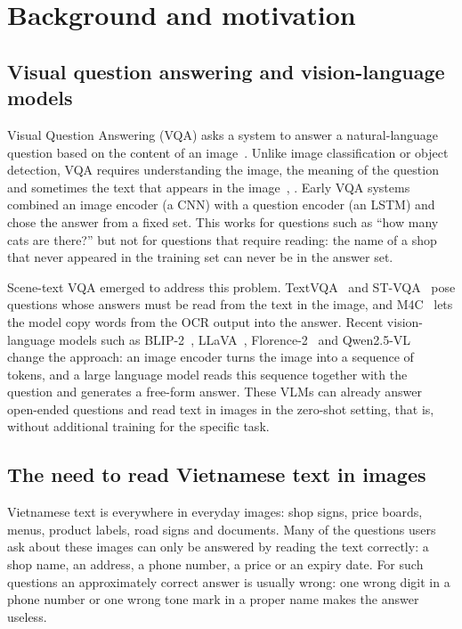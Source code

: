 \section{Background and motivation}
\label{sec:intro-background}

\subsection{Visual question answering and vision-language models}

Visual Question Answering (VQA) asks a system to answer a natural-language question
based on the content of an image~\cite{antol2015vqa}. Unlike image classification or
object detection, VQA requires understanding the image, the meaning of the question
and sometimes the text that appears in the
image~\cite{singh2019textvqa}, \cite{biten2019stvqa}. Early VQA systems combined an image
encoder (a CNN) with a question encoder (an LSTM) and chose the answer from a fixed
set. This works for questions such as ``how many cats are there?'' but not for
questions that require reading: the name of a shop that never appeared in the
training set can never be in the answer set.

Scene-text VQA emerged to address this problem. TextVQA~\cite{singh2019textvqa} and
ST-VQA~\cite{biten2019stvqa} pose questions whose answers must be read from the
text in the image, and M4C~\cite{hu2020m4c} lets the model copy words from the OCR
output into the answer. Recent vision-language models such as
BLIP-2~\cite{li2023blip2}, LLaVA~\cite{liu2023llava},
Florence-2~\cite{xiao2024florence2} and Qwen2.5-VL~\cite{bai2025qwen25vl} change the
approach: an image encoder turns the image into a sequence of tokens, and a large
language model reads this sequence together with the question and generates a
free-form answer. These VLMs can already answer open-ended questions and read text in
images in the zero-shot setting, that is, without additional training for the
specific task.

\subsection{The need to read Vietnamese text in images}

Vietnamese text is everywhere in everyday images: shop signs, price boards, menus,
product labels, road signs and documents. Many of the questions users ask about
these images can only be answered by reading the text correctly: a shop name, an
address, a phone number, a price or an expiry date. For such questions an
approximately correct answer is usually wrong: one wrong digit in a phone number or
one wrong tone mark in a proper name makes the answer useless.

